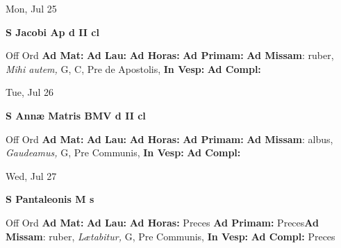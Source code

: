 \documentclass[10pt]{memoir}
\begin{document}
\begin{center}
\begin{minipage}{3.5in}
\vspace{2em}
\begin{center}Mon, Jul 25
\end{center}
\textbf{ \large S Jacobi Ap
\textnormal{\normalsize d II cl}}

\begin{justify}Off Ord
\textbf{Ad Mat: }
\textbf{Ad Lau: }
\textbf{Ad Horas: }
\textbf{Ad Primam: }\textbf{Ad Missam}: ruber, \textit{Mihi autem,} G, C, Pre de Apostolis, 
\textbf{In Vesp: }
\textbf{Ad Compl: }
\end{justify}
\end{minipage}
\end{center}

\begin{center}
\begin{minipage}{3.5in}
\vspace{2em}
\begin{center}Tue, Jul 26
\end{center}
\textbf{ \large S Annæ Matris BMV
\textnormal{\normalsize d II cl}}

\begin{justify}Off Ord
\textbf{Ad Mat: }
\textbf{Ad Lau: }
\textbf{Ad Horas: }
\textbf{Ad Primam: }\textbf{Ad Missam}: albus, \textit{Gaudeamus,} G, Pre Communis, 
\textbf{In Vesp: }
\textbf{Ad Compl: }
\end{justify}
\end{minipage}
\end{center}

\begin{center}
\begin{minipage}{3.5in}
\vspace{2em}
\begin{center}Wed, Jul 27
\end{center}
\textbf{ \large S Pantaleonis M
\textnormal{\normalsize s}}

\begin{justify}Off Ord
\textbf{Ad Mat: }
\textbf{Ad Lau: }
\textbf{Ad Horas: }Preces
\textbf{Ad Primam: }Preces\textbf{Ad Missam}: ruber, \textit{Lætabitur,} G, Pre Communis, 
\textbf{In Vesp: }
\textbf{Ad Compl: }Preces
\end{justify}
\end{minipage}
\end{center}
\end{document}
